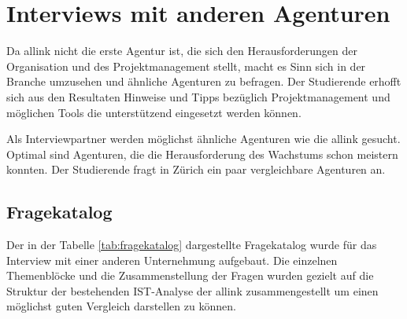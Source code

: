 \section{Interviews mit anderen Agenturen}
Da allink nicht die erste Agentur ist, die sich den Herausforderungen der
Organisation und des Projektmanagement stellt, macht es Sinn sich in der Branche
umzusehen und ähnliche Agenturen zu befragen. Der Studierende erhofft sich aus
den Resultaten Hinweise und Tipps bezüglich Projektmanagement und möglichen
Tools die unterstützend eingesetzt werden können.

Als Interviewpartner werden möglichst ähnliche Agenturen wie die allink gesucht.
Optimal sind Agenturen, die die Herausforderung des Wachstums schon meistern
konnten. Der Studierende fragt in Zürich ein paar vergleichbare Agenturen an.

\subsection{Fragekatalog}
Der in der Tabelle \ref{tab:fragekatalog} dargestellte Fragekatalog wurde für 
das Interview mit einer anderen Unternehmung aufgebaut. Die einzelnen Themenblöcke 
und die Zusammenstellung der Fragen wurden gezielt auf die Struktur der bestehenden 
IST-Analyse der allink zusammengestellt um einen möglichst guten Vergleich darstellen 
zu können.

